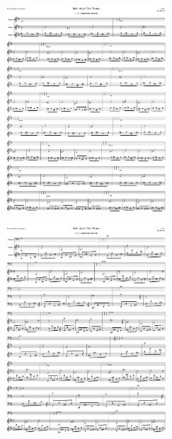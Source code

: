 \begin{figure}[H]                                             
{                                                             
  \setlength{\tabcolsep}{3.0pt}                               
  \setlength\cmidrulewidth{\heavyrulewidth} %
    \begin{subfigure}{0.5\textwidth}                            
  \includegraphics[width=6cm]{music/title_no_11_page_1001.png}%
    \end{subfigure}                                             
  \begin{subfigure}{0.5\textwidth}                            
  \includegraphics[width=6cm]{music/title_no_12_page_1001.png}%
    \end{subfigure}                                             
}                                                             
\end{figure}                                                  


